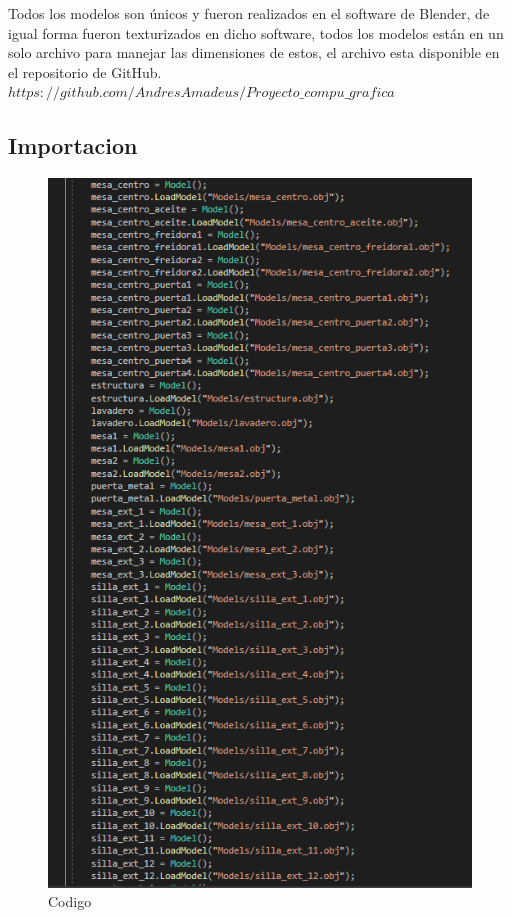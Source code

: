\documentclass[letter,12pt]{article}
\begin{document}
Todos los modelos son únicos y fueron realizados en el software de Blender, de igual forma fueron texturizados en dicho software, todos los modelos están en un solo archivo para manejar las dimensiones de estos, el archivo esta disponible en el repositorio de GitHub.\\

$https://github.com/AndresAmadeus/Proyecto\_compu\_grafica$\\


\subsection{Importacion}
\begin{figure}[H]
		\includegraphics[scale=0.5]{img/img3}
		\centering
		\caption{Codigo}
	\end{figure}
\end{document}
